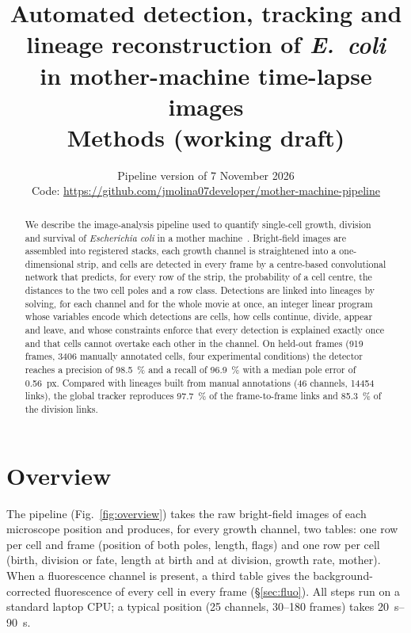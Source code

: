 \documentclass[11pt,a4paper]{article}
\title{Automated detection, tracking and lineage reconstruction of \emph{E.~coli}\\ in mother-machine time-lapse images\\[4pt] \large Methods (working draft)}
\author{}
\date{Pipeline version of 7 November 2026\\[2pt] \small Code: \url{https://github.com/jmolina07developer/mother-machine-pipeline}}
\begin{document}
\maketitle

\begin{abstract}
\noindent
We describe the image-analysis pipeline used to quantify single-cell growth, division and survival of \emph{Escherichia coli} in a mother machine~\cite{wang2010}. Bright-field images are assembled into registered stacks, each growth channel is straightened into a one-dimensional strip, and cells are detected in every frame by a centre-based convolutional network that predicts, for every row of the strip, the probability of a cell centre, the distances to the two cell poles and a row class. Detections are linked into lineages by solving, for each channel and for the whole movie at once, an integer linear program whose variables encode which detections are cells, how cells continue, divide, appear and leave, and whose constraints enforce that every detection is explained exactly once and that cells cannot overtake each other in the channel. On held-out frames (\num{919} frames, \num{3406} manually annotated cells, four experimental conditions) the detector reaches a precision of \SI{98.5}{\percent} and a recall of \SI{96.9}{\percent} with a median pole error of \SI{0.56}{px}. Compared with lineages built from manual annotations (46 channels, \num{14454} links), the global tracker reproduces \SI{97.7}{\percent} of the frame-to-frame links and \SI{85.3}{\percent} of the division links.
\end{abstract}

\tableofcontents

\section{Overview}

The pipeline (Fig.~\ref{fig:overview}) takes the raw bright-field images of each microscope position and produces, for every growth channel, two tables: one row per cell and frame (position of both poles, length, flags) and one row per cell (birth, division or fate, length at birth and at division, growth rate, mother). When a fluorescence channel is present, a third table gives the background-corrected fluorescence of every cell in every frame (\S\ref{sec:fluo}). All steps run on a standard laptop CPU; a typical position (25 channels, \numrange{30}{180} frames) takes \SIrange{20}{90}{\second}.
\end{document}
